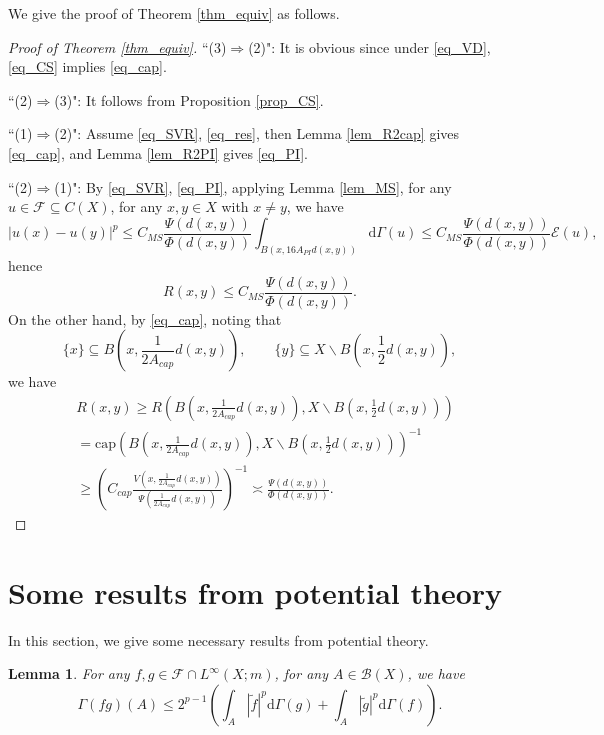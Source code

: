 \documentclass[11pt,a4paper]{article}
\numberwithin{equation}{section}
\theoremstyle{plain}
\newtheorem{lemma}[theorem]{Lemma}
\theoremstyle{definition}
\begin{document}
We give the proof of Theorem \ref{thm_equiv} as follows.

\begin{proof}[Proof of Theorem \ref{thm_equiv}]
``(3)$\Rightarrow$(2)": It is obvious since under \ref{eq_VD}, \ref{eq_CS} implies \ref{eq_cap}.

``(2)$\Rightarrow$(3)": It follows from Proposition \ref{prop_CS}.

``(1)$\Rightarrow$(2)": Assume \ref{eq_SVR}, \ref{eq_res}, then Lemma \ref{lem_R2cap} gives \ref{eq_cap}, and Lemma \ref{lem_R2PI} gives \ref{eq_PI}.

``(2)$\Rightarrow$(1)": By \ref{eq_SVR}, \ref{eq_PI}, applying Lemma \ref{lem_MS}, for any $u\in\mathcal{F}\subseteq C(X)$, for any $x,y\in X$ with $x\ne y$, we have
$$|u(x)-u(y)|^p\le C_{MS}\frac{\Psi(d(x,y))}{\Phi(d(x,y))}\int_{B(x,16A_{PI}d(x,y))}\mathrm{d}\Gamma(u)\le C_{MS}\frac{\Psi(d(x,y))}{\Phi(d(x,y))}\mathcal{E}(u),$$
hence
$$R(x,y)\le C_{MS}\frac{\Psi(d(x,y))}{\Phi(d(x,y))}.$$
On the other hand, by \ref{eq_cap}, noting that
$$\{x\}\subseteq B(x,\frac{1}{2A_{cap}}d(x,y)),\qquad\{y\}\subseteq X\backslash B(x,\frac{1}{2}d(x,y)),$$
we have
\begin{align*}
&R(x,y)\ge R(B(x,\frac{1}{2A_{cap}}d(x,y)),X\backslash B(x,\frac{1}{2}d(x,y)))\\
&=\mathrm{cap}(B(x,\frac{1}{2A_{cap}}d(x,y)),X\backslash B(x,\frac{1}{2}d(x,y)))^{-1}\\
&\ge \left(C_{cap}\frac{V(x,\frac{1}{2A_{cap}}d(x,y))}{\Psi(\frac{1}{2A_{cap}}d(x,y))}\right)^{-1}\asymp \frac{\Psi(d(x,y))}{\Phi(d(x,y))}.
\end{align*}
\end{proof}

\section{Some results from potential theory}\label{sec_potential}

In this section, we give some necessary results from potential theory. 

\begin{lemma}\label{lem_Leibniz}
For any $f,g\in\mathcal{F}\cap L^\infty(X;m)$, for any $A\in\mathcal{B}(X)$, we have
\begin{equation}\label{eq_Leibniz}
\Gamma(fg)(A)\le2^{p-1}\left(\int_A|\widetilde{f}|^p\mathrm{d}\Gamma(g)+\int_A|\widetilde{g}|^p\mathrm{d}\Gamma(f)\right).
\end{equation}

\end{lemma}
\end{document}
